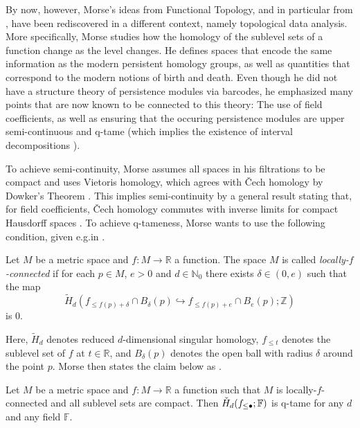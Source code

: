 By now, however, Morse's ideas from Functional Topology, and in particular from \cite{Morse.1940}, have been rediscovered in a different context, namely topological data analysis. More specifically, Morse studies how the homology of the sublevel sets of a function change as the level changes. He defines spaces that encode the same information as the modern persistent homology groups, as well as quantities that correspond to the modern notions of birth and death. Even though he did not have a structure theory of persistence modules via barcodes, he emphasized many points that are now known to be connected to this theory: The use of field coefficients, as well as ensuring that the occuring persistence modules are upper semi-continuous and q-tame (which implies the existence of interval decompositions \cite{schmahl2020structure}).

To achieve semi-continuity, Morse assumes all spaces in his filtrations to be compact and uses Vietoris homology, which agrees with \v{C}ech homology by Dowker's Theorem \cite{Dowker.1952}. This implies semi-continuity by a general result stating that, for field coefficients, \v{C}ech homology commutes with inverse limits for compact Hausdorff spaces \cite[Theorem VIII.3.6 and Theorem X.3.1]{MR0050886}. To achieve q-tameness, Morse wants to use the following condition, given e.g.\@ in \cite{Morse.1940}.

\begin{defi}
	Let $M$ be a metric space and $f\colon M\to\mathbb{R}$ a function. The space $M$ is called \emph{locally-$f$-connected} if for each $p\in M$, $e>0$ and $d\in\mathbb{N}_0$ there exists $\delta\in(0,e)$ such that the map 
	\[
	\tilde{H}_d(f_{\leq f(p)+\delta}\cap B_{\delta}(p)\hookrightarrow f_{\leq f(p)+e}\cap B_e(p);\mathbb{Z})
	\]
	is 0.
\end{defi}

Here, $\tilde{H}_{d}$ denotes reduced $d$-dimensional singular homology, $f_{\leq t}$ denotes the sublevel set of $f$ at $t\in\mathbb{R}$, and $B_{\delta}(p)$ denotes the open ball with radius $\delta$ around the point $p$. Morse then states the claim below as \cite[Theorem 6.3]{Morse.1940}.

\begin{claim}
	Let $M$ be a metric space and $f\colon M\to\mathbb{R}$ a function such that $M$ is locally-$f$-connected and all sublevel sets are compact. Then $\check{H}_d(f_{\leq\bullet};\mathbb{F})$ is q-tame for any $d$ and any field $\mathbb{F}$.
\end{claim}

